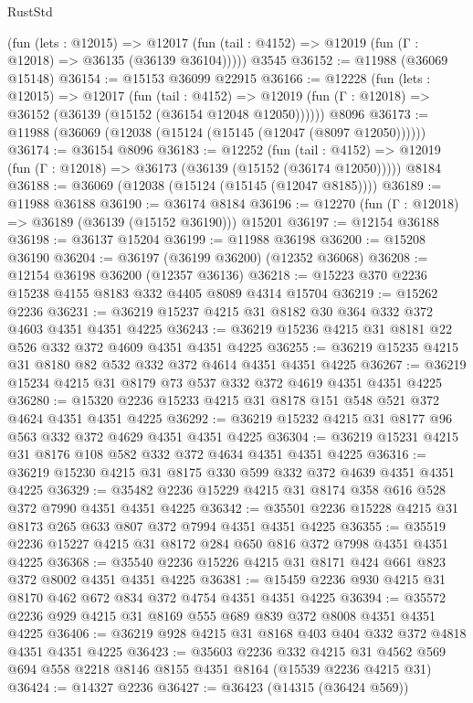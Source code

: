 \begin{lexlean}{RustStd}
\begin{coremodule}
      (fun (lets : @12015) =>
      @12017 (fun (tail : @4152) => @12019 (fun (Γ : @12018) => @36135 (@36139 @36104)))))
    @3545
@36152 := @11988 (@36069 @15148)
@36154 := @15153 @36099 @22915
@36166 := @12228
    (fun (lets : @12015) =>
    @12017
      (fun (tail : @4152) =>
      @12019 (fun (Γ : @12018) => @36152 (@36139 (@15152 (@36154 @12048 @12050))))))
    @8096
@36173 := @11988 (@36069 (@12038 (@15124 (@15145 (@12047 (@8097 @12050))))))
@36174 := @36154 @8096
@36183 := @12252
    (fun (tail : @4152) => @12019 (fun (Γ : @12018) => @36173 (@36139 (@15152 (@36174 @12050)))))
    @8184
@36188 := @36069 (@12038 (@15124 (@15145 (@12047 @8185))))
@36189 := @11988 @36188
@36190 := @36174 @8184
@36196 := @12270 (fun (Γ : @12018) => @36189 (@36139 (@15152 @36190))) @15201
@36197 := @12154 @36188
@36198 := @36137 @15204
@36199 := @11988 @36198
@36200 := @15208 @36190
@36204 := @36197 (@36199 @36200) (@12352 @36068)
@36208 := @12154 @36198 @36200 (@12357 @36136)
@36218 := @15223 @370 @2236 @15238 @4155 @8183 @332 @4405 @8089 @4314 @15704
@36219 := @15262 @2236
@36231 := @36219 @15237 @4215 @31 @8182 @30 @364 @332 @372 @4603 @4351 @4351 @4225
@36243 := @36219 @15236 @4215 @31 @8181 @22 @526 @332 @372 @4609 @4351 @4351 @4225
@36255 := @36219 @15235 @4215 @31 @8180 @82 @532 @332 @372 @4614 @4351 @4351 @4225
@36267 := @36219 @15234 @4215 @31 @8179 @73 @537 @332 @372 @4619 @4351 @4351 @4225
@36280 := @15320 @2236 @15233 @4215 @31 @8178 @151 @548 @521 @372 @4624 @4351 @4351 @4225
@36292 := @36219 @15232 @4215 @31 @8177 @96 @563 @332 @372 @4629 @4351 @4351 @4225
@36304 := @36219 @15231 @4215 @31 @8176 @108 @582 @332 @372 @4634 @4351 @4351 @4225
@36316 := @36219 @15230 @4215 @31 @8175 @330 @599 @332 @372 @4639 @4351 @4351 @4225
@36329 := @35482 @2236 @15229 @4215 @31 @8174 @358 @616 @528 @372 @7990 @4351 @4351 @4225
@36342 := @35501 @2236 @15228 @4215 @31 @8173 @265 @633 @807 @372 @7994 @4351 @4351 @4225
@36355 := @35519 @2236 @15227 @4215 @31 @8172 @284 @650 @816 @372 @7998 @4351 @4351 @4225
@36368 := @35540 @2236 @15226 @4215 @31 @8171 @424 @661 @823 @372 @8002 @4351 @4351 @4225
@36381 := @15459 @2236 @930 @4215 @31 @8170 @462 @672 @834 @372 @4754 @4351 @4351 @4225
@36394 := @35572 @2236 @929 @4215 @31 @8169 @555 @689 @839 @372 @8008 @4351 @4351 @4225
@36406 := @36219 @928 @4215 @31 @8168 @403 @404 @332 @372 @4818 @4351 @4351 @4225
@36423 := @35603
    @2236
    @332
    @4215
    @31
    @4562
    @569
    @694
    @558
    @2218
    @8146
    @8155
    @4351
    @8164
    (@15539 @2236 @4215 @31)
@36424 := @14327 @2236
@36427 := @36423 (@14315 (@36424 @569))

\end{coremodule}
\end{lexlean}
